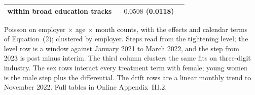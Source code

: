 \begin{table}[ht!]
\begin{tabular}{lcc}
\quad within broad education tracks & $-0.0508$ (0.0118) & \\
\bottomrule
\end{tabular}
\begin{minipage}{0.92\textwidth}\footnotesize\vspace{4pt}
Poisson on employer $\times$ age $\times$ month counts, with the effects and calendar terms of Equation~(2); clustered by employer. Steps read from the tightening level; the level row is a window against January 2021 to March 2022, and the step from 2023 is post minus interim. The third column clusters the same fits on three-digit industry. The sex rows interact every treatment term with female; young women is the male step plus the differential. The drift rows are a linear monthly trend to November 2022. Full tables in Online Appendix~III.2.
\end{minipage}
\end{table}
